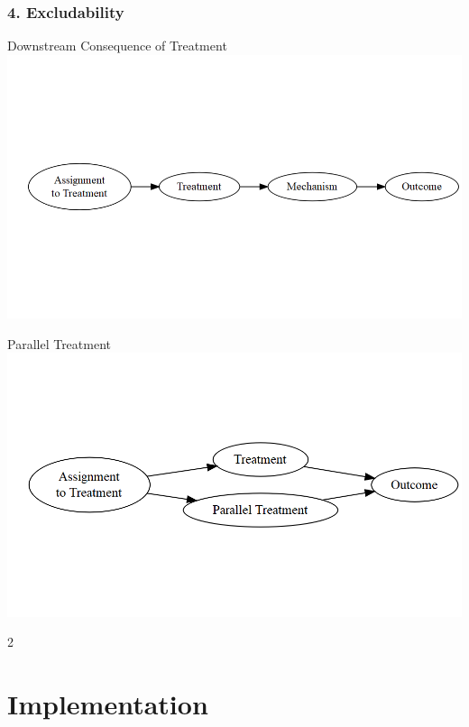 \documentclass[xcolor=x11names,compress]{beamer}\usepackage[]{graphicx}\usepackage[]{color}
\makeatletter
\def\maxwidth{ %
  \ifdim\Gin@nat@width>\linewidth
    \linewidth
  \else
    \Gin@nat@width
  \fi
}
\newenvironment{knitrout}{}{} %
\renewcommand{\(}{\begin{columns}}
\renewcommand{\)}{\end{columns}}
\newcommand{\<}[1]{\begin{column}{#1}}
\renewcommand{\>}{\end{column}}
\makeatother
\begin{document}
\begin{frame}
\frametitle{4. Excludability}
\begin{multicols}{2}
Downstream Consequence of Treatment
\begin{knitrout}
\color{fgcolor}
\includegraphics[width=\maxwidth]{figure/Excludability1-1} 

\end{knitrout}
\columnbreak
\pause
Parallel Treatment
\begin{knitrout}
\color{fgcolor}
\includegraphics[width=\maxwidth]{figure/Excludability2-1} 

\end{knitrout}
\end{multicols}{2}
\end{frame}

\section{Implementation}
\end{document}
